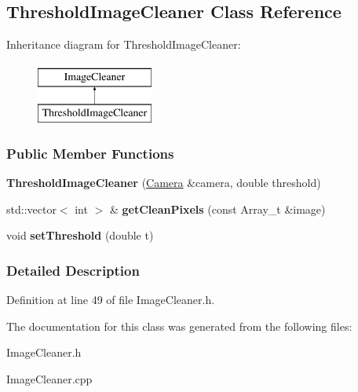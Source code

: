 \hypertarget{classThresholdImageCleaner}{
\subsection{ThresholdImageCleaner Class Reference}
\label{classThresholdImageCleaner}
}
Inheritance diagram for ThresholdImageCleaner:\begin{figure}[H]
\begin{center}
\leavevmode
\includegraphics[height=2.000000cm]{classThresholdImageCleaner}
\end{center}
\end{figure}
\subsubsection*{Public Member Functions}
\begin{DoxyCompactItemize}
\item 
\hypertarget{classThresholdImageCleaner_a05c0a4b84a05ac2e4bdf27a7afb953b8}{
{\bfseries ThresholdImageCleaner} (\hyperlink{classCamera}{Camera} \&camera, double threshold)}
\label{classThresholdImageCleaner_a05c0a4b84a05ac2e4bdf27a7afb953b8}

\item 
\hypertarget{classThresholdImageCleaner_a3e13ef3a8c14961f48020090eff22e6f}{
std::vector$<$ int $>$ \& {\bfseries getCleanPixels} (const Array\_\-t \&image)}
\label{classThresholdImageCleaner_a3e13ef3a8c14961f48020090eff22e6f}

\item 
\hypertarget{classThresholdImageCleaner_af24c03f6745f6fa5a818e06c8dc46827}{
void {\bfseries setThreshold} (double t)}
\label{classThresholdImageCleaner_af24c03f6745f6fa5a818e06c8dc46827}

\end{DoxyCompactItemize}


\subsubsection{Detailed Description}


Definition at line 49 of file ImageCleaner.h.



The documentation for this class was generated from the following files:\begin{DoxyCompactItemize}
\item 
ImageCleaner.h\item 
ImageCleaner.cpp\end{DoxyCompactItemize}
